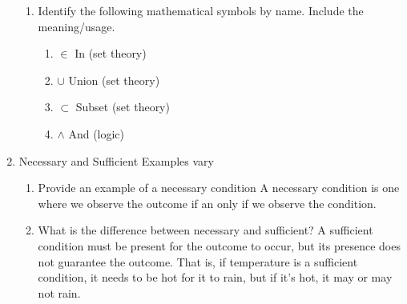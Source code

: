\documentclass[11pt]{article}
\begin{document}
\begin{enumerate}
\begin{enumerate}
\item Identify the following mathematical symbols by name. Include the meaning/usage. 
\begin{enumerate}
\item $\in$ \color{gray} In (set theory) \color{black}
\item $\cup$ \color{gray} Union (set theory) \color{black}
\item $\subset$ \color{gray} Subset (set theory) \color{black}
\item $\wedge$ \color{gray} And (logic) \color{black}
\end{enumerate}
\end{enumerate}

\item Necessary and Sufficient \color{gray} Examples vary \color{black}
\begin{enumerate}
\item Provide an example of a necessary condition \color{gray} A necessary condition is one where we observe the outcome if an only if we observe the condition.  \color{black}
\item What is the difference between necessary and sufficient? \color{gray} A sufficient condition must be present for the outcome to occur, but its presence does not guarantee the outcome. That is, if temperature is a sufficient condition, it needs to be hot for it to rain, but if it's hot, it may or may not rain. \color{black}
\end{enumerate}
\end{enumerate}
\end{document}
